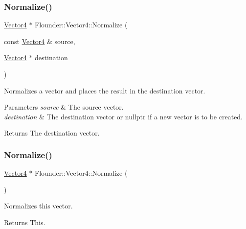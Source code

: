 \subsubsection{\texorpdfstring{Normalize()}{Normalize()}\hspace{0.1cm}{\footnotesize\ttfamily [1/2]}}
{\footnotesize\ttfamily \hyperlink{class_flounder_1_1_vector4}{Vector4} $\ast$ Flounder\+::\+Vector4\+::\+Normalize (\begin{DoxyParamCaption}\item[{const \hyperlink{class_flounder_1_1_vector4}{Vector4} \&}]{source,  }\item[{\hyperlink{class_flounder_1_1_vector4}{Vector4} $\ast$}]{destination }\end{DoxyParamCaption})\hspace{0.3cm}{\ttfamily [static]}}



Normalizes a vector and places the result in the destination vector. 


\begin{DoxyParams}{Parameters}
{\em source} & The source vector. \\
\hline
{\em destination} & The destination vector or nullptr if a new vector is to be created. \\
\hline
\end{DoxyParams}
\begin{DoxyReturn}{Returns}
The destination vector. 
\end{DoxyReturn}
\mbox{\label{class_flounder_1_1_vector4_a3943e5d0788b928c87e9e0b38dac2f61}} 
\subsubsection{\texorpdfstring{Normalize()}{Normalize()}\hspace{0.1cm}{\footnotesize\ttfamily [2/2]}}
{\footnotesize\ttfamily \hyperlink{class_flounder_1_1_vector4}{Vector4} $\ast$ Flounder\+::\+Vector4\+::\+Normalize (\begin{DoxyParamCaption}{ }\end{DoxyParamCaption})}



Normalizes this vector. 

\begin{DoxyReturn}{Returns}
This. 
\end{DoxyReturn}
\mbox{\label{class_flounder_1_1_vector4_a632d81434743d232e0339ca80ae69222}} 
